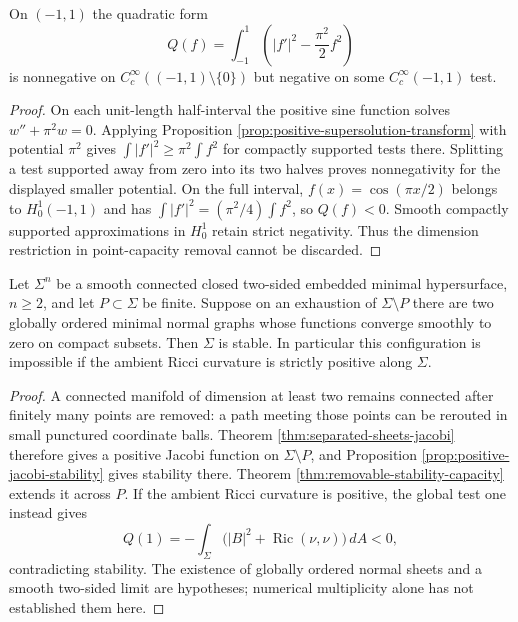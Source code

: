 \begin{example}\label{ex:point-removal-one-dimensional}
On $(-1,1)$ the quadratic form
\[
 Q(f)=\int_{-1}^1\left(|f'|^2-\frac{\pi^2}{2}f^2\right)
\]
is nonnegative on $C_c^\infty((-1,1)\setminus\{0\})$ but negative on some $C_c^\infty(-1,1)$ test.
\end{example}
\begin{proof}
On each unit-length half-interval the positive sine function solves $w''+\pi^2w=0$. Applying Proposition \ref{prop:positive-supersolution-transform} with potential $\pi^2$ gives $\int|f'|^2\geq\pi^2\int f^2$ for compactly supported tests there. Splitting a test supported away from zero into its two halves proves nonnegativity for the displayed smaller potential. On the full interval, $f(x)=\cos(\pi x/2)$ belongs to $H_0^1(-1,1)$ and has $\int|f'|^2=(\pi^2/4)\int f^2$, so $Q(f)<0$. Smooth compactly supported approximations in $H_0^1$ retain strict negativity. Thus the dimension restriction in point-capacity removal cannot be discarded.
\end{proof}

\begin{corollary}\label{cor:ordered-sheets-punctured-stability}
Let $\Sigma^n$ be a smooth connected closed two-sided embedded minimal hypersurface, $n\geq2$, and let $P\subset\Sigma$ be finite. Suppose on an exhaustion of $\Sigma\setminus P$ there are two globally ordered minimal normal graphs whose functions converge smoothly to zero on compact subsets. Then $\Sigma$ is stable. In particular this configuration is impossible if the ambient Ricci curvature is strictly positive along $\Sigma$.
\end{corollary}
\begin{proof}
A connected manifold of dimension at least two remains connected after finitely many points are removed: a path meeting those points can be rerouted in small punctured coordinate balls. Theorem \ref{thm:separated-sheets-jacobi} therefore gives a positive Jacobi function on $\Sigma\setminus P$, and Proposition \ref{prop:positive-jacobi-stability} gives stability there. Theorem \ref{thm:removable-stability-capacity} extends it across $P$. If the ambient Ricci curvature is positive, the global test one instead gives
\[
 Q(1)=-\int_\Sigma\bigl(|B|^2+\operatorname{Ric}(\nu,\nu)\bigr)\,dA<0,
\]
contradicting stability. The existence of globally ordered normal sheets and a smooth two-sided limit are hypotheses; numerical multiplicity alone has not established them here.
\end{proof}
